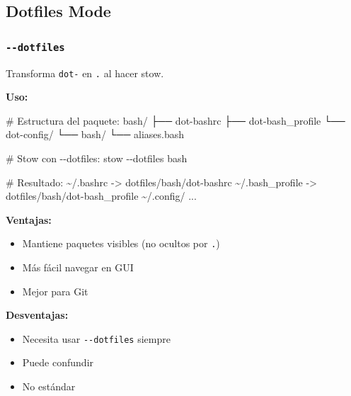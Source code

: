 \documentclass[
  doc,
  floatsintext,
  longtable,
  a4paper,
  nolmodern,
  notxfonts,
  notimes,
  12pt,
  colorlinks=true,linkcolor=blue,citecolor=blue,urlcolor=blue]{apa7}
\newenvironment{Shaded}{\begin{snugshade}}{\end{snugshade}}
\newcommand{\AttributeTok}[1]{\textcolor[rgb]{0.40,0.45,0.13}{#1}}
\newcommand{\CommentTok}[1]{\textcolor[rgb]{0.37,0.37,0.37}{#1}}
\newcommand{\ExtensionTok}[1]{\textcolor[rgb]{0.00,0.23,0.31}{#1}}
\newcommand{\NormalTok}[1]{\textcolor[rgb]{0.00,0.23,0.31}{#1}}
\newcommand{\OperatorTok}[1]{\textcolor[rgb]{0.37,0.37,0.37}{#1}}
\providecommand{\tightlist}{%
  \setlength{\itemsep}{0pt}\setlength{\parskip}{0pt}}
\begin{document}
\subsection{Dotfiles Mode}\label{dotfiles-mode}

\subsubsection{\texorpdfstring{\texttt{-\/-dotfiles}}{-\/-dotfiles}}\label{dotfiles}

Transforma \texttt{dot-} en \texttt{.} al hacer stow.

\textbf{Uso:}

\begin{Shaded}
\begin{Highlighting}[]
\CommentTok{\# Estructura del paquete:}
\ExtensionTok{bash/}
  \ExtensionTok{├──}\NormalTok{ dot{-}bashrc}
  \ExtensionTok{├──}\NormalTok{ dot{-}bash\_profile}
  \ExtensionTok{└──}\NormalTok{ dot{-}config/}
      \ExtensionTok{└──}\NormalTok{ bash/}
          \ExtensionTok{└──}\NormalTok{ aliases.bash}

\CommentTok{\# Stow con {-}{-}dotfiles:}
\ExtensionTok{stow} \AttributeTok{{-}{-}dotfiles}\NormalTok{ bash}

\CommentTok{\# Resultado:}
\ExtensionTok{\textasciitilde{}/.bashrc} \AttributeTok{{-}}\OperatorTok{\textgreater{}}\NormalTok{ dotfiles/bash/dot{-}bashrc}
\ExtensionTok{\textasciitilde{}/.bash\_profile} \AttributeTok{{-}}\OperatorTok{\textgreater{}}\NormalTok{ dotfiles/bash/dot{-}bash\_profile}
\ExtensionTok{\textasciitilde{}/.config/}\NormalTok{ ...}
\end{Highlighting}
\end{Shaded}

\textbf{Ventajas:}

\begin{itemize}
\tightlist
\item
  Mantiene paquetes visibles (no ocultos por \texttt{.})
\item
  Más fácil navegar en GUI
\item
  Mejor para Git
\end{itemize}

\textbf{Desventajas:}

\begin{itemize}
\tightlist
\item
  Necesita usar \texttt{-\/-dotfiles} siempre
\item
  Puede confundir
\item
  No estándar
\end{itemize}
\end{document}
